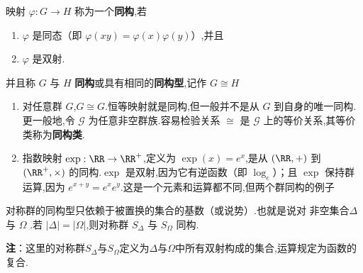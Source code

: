 \begin{definition}
	映射 $\varphi:G\to H$ 称为一个\textbf{同构},若
\begin{enumerate}[label=(\arabic*)]
	\item $\varphi$ 是同态（即 $\varphi(xy)=\varphi(x)\varphi(y)$）,并且
	\item $\varphi$ 是双射.
\end{enumerate}
并且称 $G$ 与 $H$ \textbf{同构}或具有相同的\textbf{同构型},记作 $G\cong H$
\end{definition}
\begin{example}
	\begin{enumerate}[label=(\arabic*)]
	\item 对任意群 $G$,$G\cong G$.恒等映射就是同构,但一般并不是从 $G$ 到自身的唯一同构.更一般地,令 $\mathcal{G}$ 为任意非空群族.容易检验关系 $\cong$ 是 $\mathcal{G}$ 上的等价关系,其等价类称为\textbf{同构类}.
	\item 指数映射 $\exp:\RR\to\RR^+$,定义为 $\exp(x)=e^x$,是从 $(\RR,+)$ 到 $(\RR^+,\times)$ 的同构.$\exp$ 是双射,因为它有逆函数（即 $\log_e$）；且 $\exp$ 保持群运算,因为 $e^{x+y}=e^xe^y$.这是一个元素和运算都不同,但两个群同构的例子
\end{enumerate}
\end{example}
\begin{proposition}
	对称群的同构型只依赖于被置换的集合的基数（或说势）.也就是说对 非空集合$\Delta$ 与 $\Omega$ .若 $|\Delta|=|\Omega|$,则对称群 $S_\Delta$ 与 $S_\Omega$ 同构.
\end{proposition}
\textbf{注}：这里的对称群$S_{\Delta}$与$S_{\Omega}$定义为$\Delta$与$\Omega$中所有双射构成的集合,运算规定为函数的复合.
